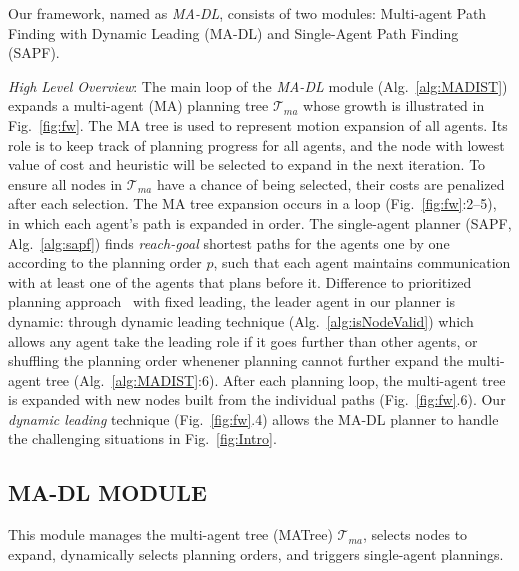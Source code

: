 \documentclass[letterpaper, 10 pt, conference]{ieeeconf}  %
\newcommand{\Symbol}[1]{\ensuremath{\mathcal{#1}}}
\newcommand{\Tree}{\Symbol{T}}
\begin{document}
Our framework, named as \emph{MA-DL}, consists of two modules: Multi-agent Path Finding with Dynamic Leading (MA-DL) and Single-Agent Path Finding (SAPF).

\textit{High Level Overview}:
The main loop of the \emph{MA-DL} module (Alg.~\ref{alg:MADIST}) expands a multi-agent (MA) 
planning tree $\Tree_{ma}$ whose growth is illustrated in Fig.~\ref{fig:fw}. The MA tree is used 
to represent motion expansion of all agents. Its role is to keep track of planning progress 
for all agents, and the node with lowest value of cost and heuristic will be selected to 
expand in the next iteration.
To ensure all nodes in $\Tree_{ma}$ have a chance of being selected, their costs are 
penalized after each selection.
The MA tree expansion occurs in a loop (Fig.~\ref{fig:fw}:2--5), in which each 
agent's path is expanded in order. 
The single-agent planner (SAPF, Alg.~\ref{alg:sapf}) finds \textit{reach-goal} shortest 
paths for the agents one by one according to the planning order $p$, such that each agent
maintains communication with at least one of the agents that plans before it.
Difference to prioritized planning approach~\cite{van2005prioritized} with fixed leading, 
the leader agent in our planner is dynamic: through dynamic leading technique 
(Alg.~\ref{alg:isNodeValid}) which allows any agent take the leading role if it goes 
further than other agents, or shuffling the planning 
order whenener planning cannot further expand the multi-agent tree (Alg.~\ref{alg:MADIST}:6).
After each planning loop, the multi-agent tree is expanded with new nodes built from the individual paths (Fig.~\ref{fig:fw}.6).
Our \textit{dynamic leading} technique (Fig.~\ref{fig:fw}.4) allows the MA-DL planner 
to handle the challenging situations in Fig.~\ref{fig:Intro}.


\subsection{MA-DL MODULE} \label{sec:MADIST}
This module manages the multi-agent tree (MATree) $\Tree_{ma}$, selects nodes to expand, 
dynamically selects planning orders, and triggers single-agent plannings. 
\end{document}
